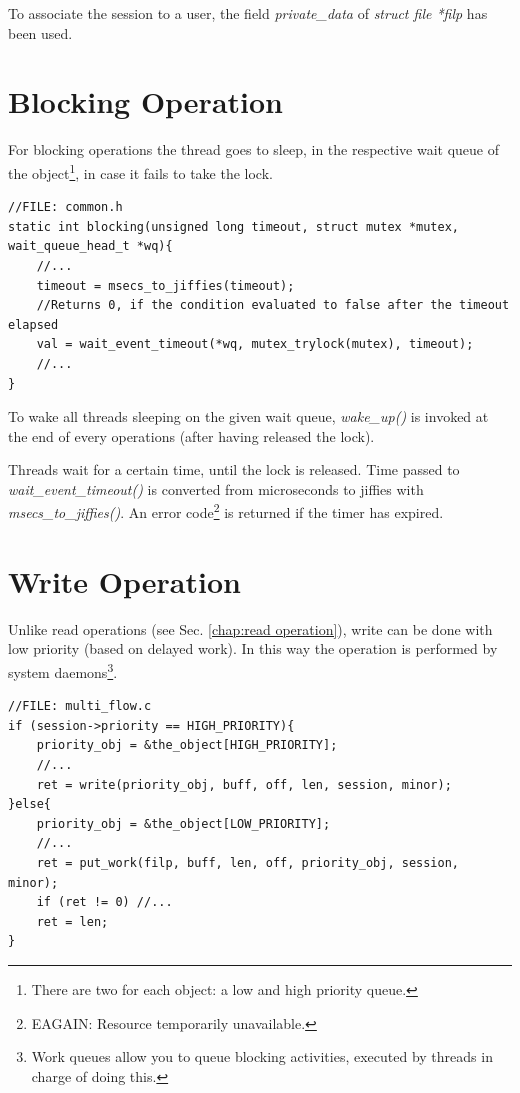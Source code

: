 \documentclass[12pt]{report}
\begin{document}
To associate the session to a user, the field \emph{private\_data} of \emph{struct file *filp} has been used. 

\section{Blocking Operation}
\label{chap:blocking operation}
For blocking operations the thread goes to sleep, in the respective wait queue of the object\footnote{There are  two for each object: a low and high priority queue.}, in case it fails to take the lock. 

\begin{lstlisting}
//FILE: common.h
static int blocking(unsigned long timeout, struct mutex *mutex, wait_queue_head_t *wq){
	//...	
	timeout = msecs_to_jiffies(timeout); 	
	//Returns 0, if the condition evaluated to false after the timeout elapsed
	val = wait_event_timeout(*wq, mutex_trylock(mutex), timeout);
	//...
}
\end{lstlisting}

To wake all threads sleeping on the given wait queue, \emph{wake\_up()} is invoked at the end of every operations (after having released the lock). 

Threads wait for a certain time, until the lock is released. Time passed to \emph{wait\_event\_timeout()} is converted from microseconds to jiffies with \emph{msecs\_to\_jiffies()}. An error code\footnote{EAGAIN: Resource temporarily unavailable.} is returned if the timer has expired.

\section{Write Operation}
\label{chap:write operation}

Unlike read operations (see Sec. \ref{chap:read operation}), write can be done with low priority (based on delayed work). In this way the operation is performed by system daemons\footnote{Work queues allow you to queue blocking activities, executed by threads in charge of doing this.}.

\begin{lstlisting}
//FILE: multi_flow.c
if (session->priority == HIGH_PRIORITY){
	priority_obj = &the_object[HIGH_PRIORITY];
	//...	
	ret = write(priority_obj, buff, off, len, session, minor);
}else{
	priority_obj = &the_object[LOW_PRIORITY];
	//...	
	ret = put_work(filp, buff, len, off, priority_obj, session, minor);
	if (ret != 0) //...
	ret = len;
}
\end{lstlisting}
\end{document}
